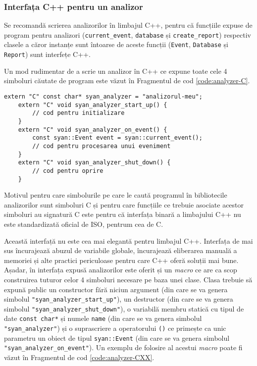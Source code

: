\subsubsection{Interfața C++ pentru un analizor}

Se recomandă scrierea analizorilor în limbajul C++, pentru că funcțiile
expuse de program pentru analizori (\lstinline{current_event},
\lstinline{database} și \lstinline{create_report}) respectiv clasele a
căror instanțe sunt întoarse de aceste funcții (\lstinline{Event},
\lstinline{Database} și \lstinline{Report}) sunt interfețe C++.

Un mod rudimentar de a scrie un analizor în C++ ce expune toate cele 4
simboluri căutate de program este văzut în Fragmentul de cod
\ref{code:analyzer-C}.
\begin{lstlisting}[caption=Interfața rudimentară a unui analizor,
                   label=code:analyzer-C]
    extern "C" const char* syan_analyzer = "analizorul-meu";
    extern "C" void syan_analyzer_start_up() {
        // cod pentru initializare
    }
    extern "C" void syan_analyzer_on_event() {
        const syan::Event event = syan::current_event();
        // cod pentru procesarea unui eveniment
    }
    extern "C" void syan_analyzer_shut_down() {
        // cod pentru oprire
    }
\end{lstlisting}
Motivul pentru care simbolurile pe care le caută programul în
bibliotecile analizorilor sunt simboluri C și pentru care funcțiile ce
trebuie asociate acestor simboluri au signatură C este pentru că
interfața binară a limbajului C++ nu este standardizată oficial de ISO,
pentrum cea de C.

Această interfață nu este cea mai elegantă pentru limbajul C++.
Interfața de mai sus încurajează abuzul de variabile globale,
încurajează eliberarea manuală a memoriei și alte practici periculoase
pentru care C++ oferă soluții mai bune. Așadar, în interfața expusă
analizorilor este oferit și un \textit{macro} ce are ca scop construirea
tuturor celor 4 simboluri necesare pe baza unei clase. Clasa trebuie să
expună public un constructor fără niciun argument (din care se va genera
simbolul \lstinline{"syan_analyzer_start_up"}), un destructor (din care
se va genera simbolul \lstinline{"syan_analyzer_shut_down"}), o
variabilă membru statică cu tipul de date \lstinline{const char*} și
numele \lstinline{name} (din care se va genera simbolul
\lstinline{"syan_analyzer"}) și o suprascriere a operatorului
\lstinline{()} ce primește ca unic parametru un obiect de tipul
\lstinline{syan::Event} (din care se va genera simbolul
\lstinline{"syan_analyzer_on_event"}). Un exemplu de folosire al acestui
\textit{macro} poate fi văzut în Fragmentul de cod
\ref{code:analyzer-CXX}.

